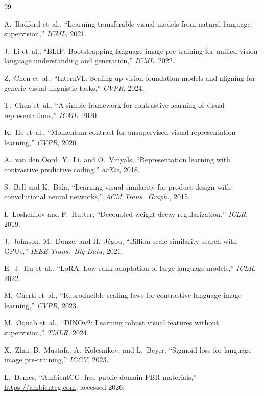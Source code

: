 \documentclass[10pt,twocolumn]{article}
\begin{document}

\begin{thebibliography}{99}

A.~Radford et~al., ``Learning transferable visual models from natural language
supervision,'' \textit{ICML}, 2021.

J.~Li et~al., ``BLIP: Bootstrapping language-image pre-training for unified
vision-language understanding and generation,'' \textit{ICML}, 2022.

Z.~Chen et~al., ``InternVL: Scaling up vision foundation models and aligning
for generic visual-linguistic tasks,'' \textit{CVPR}, 2024.

T.~Chen et~al., ``A simple framework for contrastive learning of visual
representations,'' \textit{ICML}, 2020.

K.~He et~al., ``Momentum contrast for unsupervised visual representation
learning,'' \textit{CVPR}, 2020.

A.~van den Oord, Y.~Li, and O.~Vinyals, ``Representation learning with
contrastive predictive coding,'' \textit{arXiv}, 2018.

S.~Bell and K.~Bala, ``Learning visual similarity for product design with
convolutional neural networks,'' \textit{ACM Trans.\ Graph.}, 2015.

I.~Loshchilov and F.~Hutter, ``Decoupled weight decay regularization,''
\textit{ICLR}, 2019.

J.~Johnson, M.~Douze, and H.~Jégou, ``Billion-scale similarity search with
GPUs,'' \textit{IEEE Trans.\ Big Data}, 2021.

E.~J.~Hu et~al., ``LoRA: Low-rank adaptation of large language models,''
\textit{ICLR}, 2022.

M.~Cherti et~al., ``Reproducible scaling laws for contrastive language-image
learning,'' \textit{CVPR}, 2023.

M.~Oquab et~al., ``DINOv2: Learning robust visual features without
supervision,'' \textit{TMLR}, 2024.

X.~Zhai, B.~Mustafa, A.~Kolesnikov, and L.~Beyer, ``Sigmoid loss for language
image pre-training,'' \textit{ICCV}, 2023.

L.~Demes, ``AmbientCG: free public domain PBR materials,''
\url{https://ambientcg.com}, accessed 2026.

\end{thebibliography}
\end{document}
